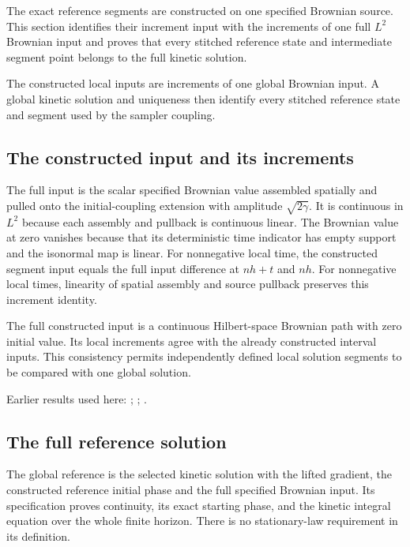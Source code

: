 \documentclass[11pt,a4paper]{report}
\begin{document}
The exact reference segments are constructed on one specified Brownian source. This section identifies their increment input with the increments of one full \(L^{2}\) Brownian input and proves that every stitched reference state and intermediate segment point belongs to the full kinetic solution.



The constructed local inputs are increments of one global Brownian input. A global kinetic solution and uniqueness then identify every stitched reference state and segment used by the sampler coupling.

\subsection{\texorpdfstring{The constructed input and its increments}{The constructed input and its increments}}
\label{report-step-KineticLangevin-CanonicalGlobalSegments-lean-1}


The full input is the scalar specified Brownian value assembled spatially and pulled onto the initial-coupling extension with amplitude \(\sqrt{2\gamma}\). It is continuous in \(L^{2}\) because each assembly and pullback is continuous linear. The Brownian value at zero vanishes because that its deterministic time indicator has empty support and the isonormal map is linear. For nonnegative local time, the constructed segment input equals the full input difference at \(nh+t\) and \(nh\). For nonnegative local times, linearity of spatial assembly and source pullback preserves this increment identity.



The full constructed input is a continuous Hilbert-space Brownian path with zero initial value. Its local increments agree with the already constructed interval inputs. This consistency permits independently defined local solution segments to be compared with one global solution.



Earlier results used here: \cite[Section~3.17.1]{LangevinLean2026ULASC}; \cite[Section~3.8.2]{LangevinLean2026ULASC}; \cite[Section~3.8.9]{LangevinLean2026ULASC}.
\subsection{\texorpdfstring{The full reference solution}{The full reference solution}}
\label{report-step-KineticLangevin-CanonicalGlobalSegments-lean-2}


The global reference is the selected kinetic solution with the lifted gradient, the constructed reference initial phase and the full specified Brownian input. Its specification proves continuity, its exact starting phase, and the kinetic integral equation over the whole finite horizon. There is no stationary-law requirement in its definition.
\end{document}
